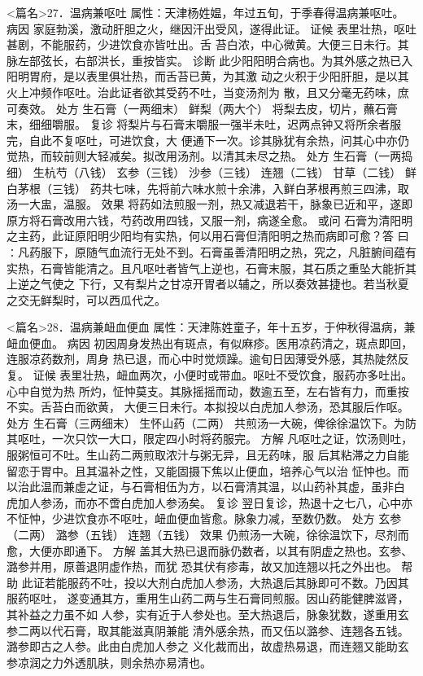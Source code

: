 \documentclass[a4paper,12pt,UTF8,twoside]{ctexbook}
\begin{document}
<篇名>27．温病兼呕吐
属性：天津杨姓媪，年过五旬，于季春得温病兼呕吐。 
病因 家庭勃溪，激动肝胆之火，继因汗出受风，遂得此证。 
证候 表里壮热，呕吐甚剧，不能服药，少进饮食亦皆吐出。舌 
苔白浓，中心微黄。大便三日未行。其脉左部弦长，右部洪长，重按皆实。 
诊断 此少阳阳明合病也。为其外感之热已入阳明胃府，是以表里俱壮热，而舌苔已黄，为其激 
动之火积于少阳肝胆，是以其火上冲频作呕吐。治此证者欲其受药不吐，当变汤剂为 
散，且又分毫无药味，庶可奏效。 
处方 生石膏（一两细末） 鲜梨（两大个） 
将梨去皮，切片，蘸石膏末，细细嚼服。 
复诊 将梨片与石膏末嚼服一强半未吐，迟两点钟又将所余者服完，自此不复呕吐，可进饮食，大 
便通下一次。诊其脉犹有余热，问其心中亦仍觉热，而较前则大轻减矣。拟改用汤剂。以清其未尽之热。 
处方 生石膏（一两捣细） 生杭芍（八钱） 玄参（三钱） 沙参（三钱） 
连翘（二钱） 甘草（二钱） 鲜白茅根（三钱） 
药共七味，先将前六味水煎十余沸，入鲜白茅根再煎三四沸，取汤一大盅，温服。 
效果 将药如法煎服一剂，热又减退若干，脉象已近和平，遂即 
原方将石膏改用六钱，芍药改用四钱，又服一剂，病遂全愈。 
或问 石膏为清阳明之主药，此证原阳明少阳均有实热，何以用石膏但清阳明之热而病即可愈？答 
曰∶凡药服下，原随气血流行无处不到。石膏虽善清阳明之热，究之，凡脏腑间蕴有 
实热，石膏皆能清之。且凡呕吐者皆气上逆也，石膏末服，其石质之重坠大能折其上逆之气使之 
下行，又有梨片之甘凉开胃者以辅之，所以奏效甚捷也。若当秋夏之交无鲜梨时，可以西瓜代之。 


<篇名>28．温病兼衄血便血
属性：天津陈姓童子，年十五岁，于仲秋得温病，兼衄血便血。 
病因 初因周身发热出有斑点，有似麻疹。医用凉药清之，斑点即回，连服凉药数剂，周身 
热已退，而心中时觉烦躁。逾旬日因薄受外感，其热陡然反复。 
证候 表里壮热，衄血两次，小便时或带血。呕吐不受饮食，服药亦多吐出。心中自觉为热 
所灼，怔忡莫支。其脉摇摇而动，数逾五至，左右皆有力，而重按不实。舌苔白而欲黄， 
大便三日未行。本拟投以白虎加人参汤，恐其服后作呕。 
处方 生石膏（三两细末） 生怀山药（二两） 
共煎汤一大碗，俾徐徐温饮下。为防其呕吐，一次只饮一大口，限定四小时将药服完。 
方解 凡呕吐之证，饮汤则吐，服粥恒可不吐。生山药二两煎取浓汁与粥无异，且无药味，服 
后其粘滞之力自能留恋于胃中。且其温补之性，又能固摄下焦以止便血，培养心气以治 
怔忡也。而以治此温而兼虚之证，与石膏相伍为方，以石膏清其温，以山药补其虚，虽非白 
虎加人参汤，而亦不啻白虎加人参汤矣。 
复诊 翌日复诊，热退十之七八，心中亦不怔忡，少进饮食亦不呕吐，衄血便血皆愈。脉象力减，至数仍数。 
处方 玄参（二两） 潞参（五钱） 连翘（五钱） 
效果 仍煎汤一大碗，徐徐温饮下，尽剂而愈，大便亦即通下。 
方解 盖其大热已退而脉仍数者，以其有阴虚之热也。玄参、潞参并用，原善退阴虚作热，而犹 
恐其伏有疹毒，故又加连翘以托之外出也。 
帮助 此证若能服药不吐，投以大剂白虎加人参汤，大热退后其脉即可不数。乃因其服药呕吐， 
遂变通其方，重用生山药二两与生石膏同煎服。因山药能健脾滋肾，其补益之力虽不如 
人参，实有近于人参处也。至大热退后，脉象犹数，遂重用玄参二两以代石膏，取其能滋真阴兼能 
清外感余热，而又伍以潞参、连翘各五钱。潞参即古之人参。此由白虎加人参之 
义化裁而出，故虚热易退，而连翘又能助玄参凉润之力外透肌肤，则余热亦易清也。 
\end{document}
